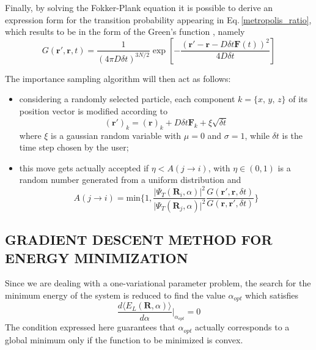 Finally, by solving the Fokker-Plank equation it is possible to derive an expression form for the transition probability appearing in Eq.\,\ref{metropolis_ratio}, which results to be in the form of the Green's function \cite{lectures2015}, namely
\begin{equation*}
    G(\bm{r}', \bm{r}, t) = \frac{1}{\left (4 \pi D \delta t\right)^{3N/2}} \exp \left[ - \frac{ \left( \bm{r}' - \bm{r} - D\delta t \bm{F}(t)\right)^2}{4D\delta t}  \right]
\end{equation*}

The importance sampling algorithm will then act as follows:
\begin{itemize}
    \item considering a randomly selected particle, each  component $k = \{x,\,y,\,z\}$ of its position vector is modified according to
    \begin{equation*}
        (\bm{r}')_k = (\bm{r})_k + D \delta t \bm{F}_k + \xi \sqrt{\delta t}
    \end{equation*}
    where $\xi$ is a gaussian random variable with $\mu = 0$ and $\sigma=1$, while $\delta t$ is the time step chosen by the user;
    \item this move gets actually accepted if $\eta < A(j\rightarrow i)$, with $\eta \in (0,1)$ is a random number generated from a uniform distribution and
    \begin{equation*}
        A(j \rightarrow i) = \text{min} \bigg\{ 1, \frac{\vert \Psi_T(\bm{R}_i, \alpha)\vert^2}{\vert \Psi_T(\bm{R}_j, \alpha)\vert^2} \frac{G(\bm{r}', \bm{r}, \delta t)}{G(\bm{r}, \bm{r}', \delta t)} \bigg\}
    \end{equation*}
\end{itemize}



\subsection{GRADIENT DESCENT METHOD FOR ENERGY MINIMIZATION}
Since we are dealing with a one-variational parameter problem, the search for the minimum energy of the system is reduced to find the value $\alpha_{opt}$ which satisfies
\begin{equation}
    \frac{d \langle E_L(\bm{R},\alpha) \rangle}{d \alpha} \bigg\vert_{\alpha_{opt}} = 0
    \label{null_derivative}
\end{equation}
The condition expressed here guarantees that $\alpha_{opt}$ actually corresponds to a global minimum only if the function to be minimized is convex.

